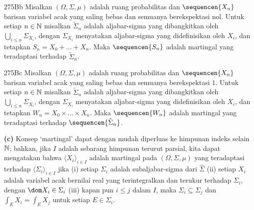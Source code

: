 \spheader 275Bb Misalkan $(\Omega,\Sigma,\mu)$ adalah ruang probabilitas
dan $\sequencen{X_n}$ barisan variabel acak yang saling bebas dan semuanya
berekspektasi nol. Untuk setiap $n\in\Bbb N$ misalkan
$\tilde\Sigma_n$ adalah aljabar-sigma yang dibangkitkan oleh
$\bigcup_{i\le n}\Sigma_{X_i}$, dengan $\Sigma_{X_i}$ menyatakan
aljabar-sigma yang didefinisikan oleh $X_i$, dan tetapkan
$S_n=X_0+\ldots+X_n$. Maka $\sequencen{S_n}$ adalah martingal yang
teradaptasi terhadap $\tilde\Sigma_n$. 

\spheader 275Bc Misalkan $(\Omega,\Sigma,\mu)$ adalah ruang probabilitas
dan $\sequencen{X_n}$ barisan variabel acak yang saling bebas dan semuanya
berekspektasi $1$. Untuk setiap $n\in\Bbb N$ misalkan
$\tilde\Sigma_n$ adalah aljabar-sigma yang dibangkitkan oleh
$\bigcup_{i\le n}\Sigma_{X_i}$, dengan $\Sigma_{X_i}$ menyatakan
aljabar-sigma yang didefinisikan oleh $X_i$, dan tetapkan
$W_n=X_0\times\ldots\times X_n$. Maka $\sequencen{W_n}$ adalah martingal
yang teradaptasi terhadap $\sequencen{\tilde\Sigma_n}$.

{\bf (c)} Konsep `martingal' dapat dengan mudah diperluas ke himpunan indeks
selain $\Bbb N$; bahkan, jika $I$ adalah sebarang himpunan terurut parsial,
kita dapat mengatakan bahwa $\langle X_i\rangle_{i\in I}$ adalah martingal
pada $(\Omega,\Sigma,\mu)$ yang teradaptasi terhadap
$\langle\Sigma_i\rangle_{i\in I}$ jika (i) setiap $\Sigma_i$ adalah
subaljabar-sigma dari $\hat\Sigma$ (ii) setiap $X_i$ adalah variabel acak
bernilai real yang terintegralkan dan terukur terhadap $\Sigma_i$, dengan
$\dom X_i\in\Sigma_i$ (iii) kapan pun $i\le j$ dalam $I$, maka
$\Sigma_i\subseteq\Sigma_j$ dan $\int_EX_i=\int_EX_j$ untuk setiap
$E\in\Sigma_i$. %

